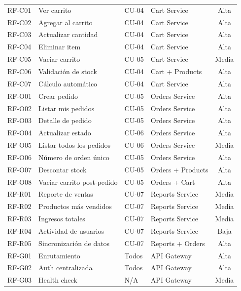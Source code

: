 \documentclass[12pt,a4paper]{article}
\begin{document}
\begin{longtable}{llllc}
\midrule
RF-C01 & Ver carrito               & CU-04       & Cart Service      & Alta  \\
RF-C02 & Agregar al carrito        & CU-04       & Cart Service      & Alta  \\
RF-C03 & Actualizar cantidad       & CU-04       & Cart Service      & Alta  \\
RF-C04 & Eliminar item             & CU-04       & Cart Service      & Alta  \\
RF-C05 & Vaciar carrito            & CU-05       & Cart Service      & Media \\
RF-C06 & Validaci\'on de stock     & CU-04       & Cart + Products   & Alta  \\
RF-C07 & C\'alculo autom\'atico    & CU-04       & Cart Service      & Alta  \\
\midrule
RF-O01 & Crear pedido              & CU-05       & Orders Service    & Alta  \\
RF-O02 & Listar mis pedidos        & CU-05       & Orders Service    & Alta  \\
RF-O03 & Detalle de pedido         & CU-05       & Orders Service    & Alta  \\
RF-O04 & Actualizar estado         & CU-06       & Orders Service    & Alta  \\
RF-O05 & Listar todos los pedidos  & CU-06       & Orders Service    & Media \\
RF-O06 & N\'umero de orden \'unico & CU-05       & Orders Service    & Alta  \\
RF-O07 & Descontar stock           & CU-05       & Orders + Products & Alta  \\
RF-O08 & Vaciar carrito post-pedido & CU-05      & Orders + Cart     & Alta  \\
\midrule
RF-R01 & Reporte de ventas         & CU-07       & Reports Service   & Media \\
RF-R02 & Productos m\'as vendidos  & CU-07       & Reports Service   & Media \\
RF-R03 & Ingresos totales          & CU-07       & Reports Service   & Media \\
RF-R04 & Actividad de usuarios     & CU-07       & Reports Service   & Baja  \\
RF-R05 & Sincronizaci\'on de datos & CU-07       & Reports + Orders  & Alta  \\
\midrule
RF-G01 & Enrutamiento              & Todos       & API Gateway       & Alta  \\
RF-G02 & Auth centralizada         & Todos       & API Gateway       & Alta  \\
RF-G03 & Health check              & N/A         & API Gateway       & Media \\
\end{longtable}
\end{document}
